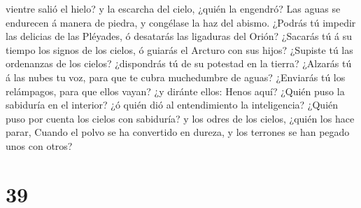 vientre salió el hielo? y la escarcha del cielo, ¿quién la engendró?
 Las aguas se endurecen á manera de piedra, y congélase
la haz del abismo.  ¿Podrás tú impedir las delicias de
las Pléyades, ó desatarás las ligaduras del Orión? 
¿Sacarás tú á su tiempo los signos de los cielos, ó guiarás el Arcturo
con sus hijos?  ¿Supiste tú las ordenanzas de los cielos?
¿dispondrás tú de su potestad en la tierra?  ¿Alzarás tú
á las nubes tu voz, para que te cubra muchedumbre de aguas?
 ¿Enviarás tú los relámpagos, para que ellos vayan? ¿y
diránte ellos: Henos aquí?  ¿Quién puso la sabiduría en
el interior? ¿ó quién dió al entendimiento la inteligencia?
 ¿Quién puso por cuenta los cielos con sabiduría? y los
odres de los cielos, ¿quién los hace parar,  Cuando el
polvo se ha convertido en dureza, y los terrones se han pegado unos con
otros?   

\hypertarget{section-38}{%
\section{39}\label{section-38}}

